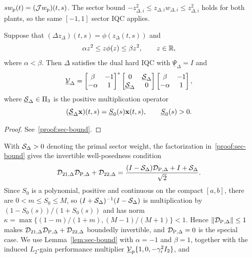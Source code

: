 $s w_{{\mathrm{p}}}(t)=(\mathcal{J}w_{{\mathrm{p}}})(t,s)$. The sector bound
$-z_{\Delta,i}^2\leq z_{\Delta,i}w_{\Delta,i}\leq z_{\Delta,i}^2$ holds for both plants,
so the same $[-1,1]$ sector IQC applies.
\begin{lemma}\label{lem:sec-bound}
Suppose that $(\Delta z_\Delta)(t,s)=\phi(z_\Delta(t,s))$ and
\begin{equation*}
 \alpha z^2\leq z\phi(z)\leq\beta z^2,
 \qquad z\in\mathbb{R},
\end{equation*}
where $\alpha<\beta$. Then $\Delta$ satisfies the dual hard IQC with
$\underline\Psi_\Delta=I$ and
\begin{equation}\label{eqn:dual-sec-mult}
 \underline{\mathcal{V}}_\Delta=
 \begin{bmatrix}\beta&-1\\-\alpha&1\end{bmatrix}^{*}
 \begin{bmatrix}0&\underline{\mathcal{S}}_\Delta\\
       \underline{\mathcal{S}}_\Delta&0\end{bmatrix}
 \begin{bmatrix}\beta&-1\\-\alpha&1\end{bmatrix},
\end{equation}
where $\underline{\mathcal{S}}_\Delta\in\Pi_3$ is the positive multiplication
operator
\begin{equation}\label{eqn:dual-sec-par}
 (\underline{\mathcal{S}}_\Delta\mathbf{x})(t,s)
 =\underline S_0(s)\mathbf{x}(t,s),\qquad \underline S_0(s)>0.
\end{equation}
\end{lemma}
\begin{proof}
See~\ref{proof:sec-bound}.
\end{proof}
With $\mathcal{S}_\Delta >0$ denoting the
primal sector weight, the factorization in~\ref{proof:sec-bound} gives the invertible well-posedness condition
\begin{equation}\label{eq:sector-feedthrough-invertibility}
 \mathcal{D}_{21,\Delta}\mathcal{D}_{{{\mathrm{P}}},\Delta}+\mathcal{D}_{22,\Delta}
 =\frac{(I-\mathcal{S}_\Delta)\mathcal{D}_{{{\mathrm{P}}},\Delta}+I+\mathcal{S}_\Delta}{\sqrt{2}}.
\end{equation}
Since $S_0$ is a polynomial, positive and continuous on the compact $[a,b]$,
there are $0<m\leq S_0\leq M$, so
$(I+\mathcal{S}_\Delta)^{-1}(I-\mathcal{S}_\Delta)$ is multiplication by
$(1-S_0(s))/(1+S_0(s))$ and has norm
$\kappa=\max\{(1-m)/(1+m),(M-1)/(M+1)\}<1$.
Hence $\|\mathcal{D}_{{{\mathrm{P}}},\Delta}\|\leq1$ makes
$\mathcal{D}_{21,\Delta}\mathcal{D}_{{{\mathrm{P}}},\Delta}+\mathcal{D}_{22,\Delta}$ boundedly
invertible, and $\mathcal{D}_{{{\mathrm{P}}},\Delta}=0$ is the special case.
We use Lemma~\ref{lem:sec-bound} with $\alpha=-1$ and $\beta=1$, together with the induced
$L_2$-gain performance multiplier $\underline{\mathcal{V}}_{{\mathrm{p}}}\{1,0,-\gamma_i^2I_2\}$, and
